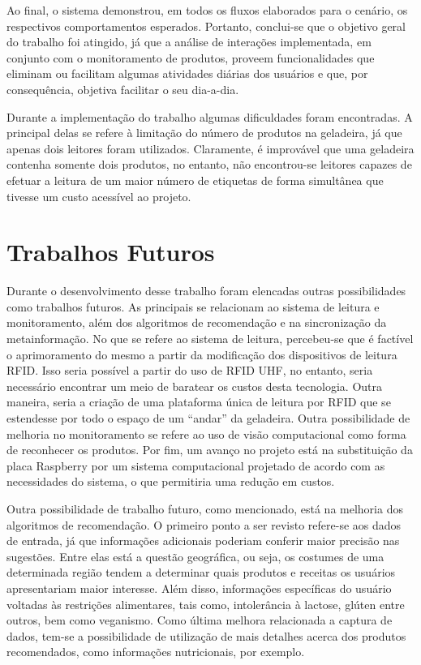 Ao final, o sistema demonstrou, em todos os fluxos elaborados para o cenário, os respectivos comportamentos esperados. Portanto, conclui-se que o objetivo geral do trabalho foi atingido, já que a análise de interações implementada, em conjunto com o monitoramento de produtos, proveem funcionalidades que eliminam ou facilitam algumas atividades diárias dos usuários e que, por consequência, objetiva facilitar o seu dia-a-dia. 

Durante a implementação do trabalho algumas dificuldades foram encontradas.
A principal delas se refere à limitação do número de produtos na geladeira, já que apenas dois leitores foram utilizados.
Claramente, é improvável que uma geladeira contenha somente dois produtos, no entanto, não encontrou-se leitores capazes de efetuar a leitura de um maior número de etiquetas de forma simultânea que tivesse um custo acessível ao projeto.



\section{Trabalhos Futuros}

Durante o desenvolvimento desse trabalho foram elencadas outras possibilidades como trabalhos futuros. As principais se relacionam ao sistema de leitura e monitoramento, além dos algoritmos de recomendação e na sincronização da metainformação. No que se refere ao sistema de leitura, percebeu-se que é factível o aprimoramento do mesmo a partir da modificação dos dispositivos de leitura RFID. Isso seria possível a partir do uso de RFID UHF, no entanto, seria necessário encontrar um meio de baratear os custos desta tecnologia. Outra maneira, seria a criação de uma plataforma única de leitura por RFID que se estendesse por todo o espaço de um ``andar'' da geladeira. Outra possibilidade de melhoria no monitoramento se refere ao uso de visão computacional como forma de reconhecer os produtos. Por fim, um avanço no projeto está na substituição da placa Raspberry\textsuperscript{\textregistered} por um sistema computacional projetado de acordo com as necessidades do sistema, o que permitiria uma redução em custos.

Outra possibilidade de trabalho futuro, como mencionado, está na melhoria dos algoritmos de recomendação. O primeiro ponto a ser revisto refere-se aos dados de entrada, já que informações adicionais poderiam conferir maior precisão nas sugestões. Entre elas está a questão geográfica, ou seja, os costumes de uma determinada região tendem a determinar quais produtos e receitas os usuários apresentariam maior interesse. Além disso, informações específicas do usuário voltadas às restrições alimentares, tais como, intolerância à lactose, glúten entre outros, bem como veganismo. Como última melhora relacionada a captura de dados, tem-se a possibilidade de utilização de mais detalhes acerca dos produtos recomendados, como informações nutricionais, por exemplo. 


